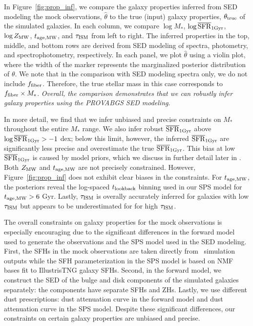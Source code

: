 In Figure~\ref{fig:prop_inf}, we compare the galaxy properties inferred from
SED modeling the mock observations, $\hat{\theta}$ to the true (input) galaxy
properties, $\theta_{\rm true}$ of the simulated galaxies.
In each column, we compare $\log M_*$, $\log \overline{\rm SFR}_{\rm 1Gyr}$, $\log Z_{\rm MW}$,
$t_{\rm age, MW}$, and $\tau_{\rm ISM}$ from left to right.  
The inferred properties in the top, middle, and bottom rows are derived from
SED modeling of spectra, photometry, and spectrophotometry, respectively.
In each panel, we plot $\hat{\theta}$ using a violin plot, where the width
of the marker represents the marginalized posterior distribution of $\theta$. 
We note that in the comparison with SED modeling spectra only, we do not
include $f_{\rm fiber}$. 
Therefore, the true stellar mass in this case corresponds to $f_{\rm fiber}
\times M_*$. 
\emph{Overall, the comparison demonstrates that we can robustly infer galaxy
properties using the {\sc PROVABGS} SED modeling}. 

In more detail, we find that we infer unbiased and precise constraints on
$M_*$ throughout the entire $M_*$ range. 
We also infer robust $\overline{\rm SFR}_{\rm 1Gyr}$ above $\log \overline{\rm SFR}_{\rm 1Gyr} > -1$ dex; below this limit,
however, the inferred $\overline{\rm SFR}_{\rm 1Gyr}$ are significantly less precise and
overestimate the true $\overline{\rm SFR}_{\rm 1Gyr}$. 
This bias at low $\overline{\rm SFR}_{\rm 1Gyr}$ is caused by model priors, which we discuss in
further detail later in . 
Both $Z_{\rm MW}$ and $t_{\rm age, MW}$ are not precisely constrained. 
However, Figure~\ref{fig:prop_inf} does not exhibit clear biases in the
constraints.
For $t_{\rm age, MW}$, the posteriors reveal the log-spaced $t_{\rm lookback}$ binning used in our
SPS model for $t_{\rm age, MW} > 6$ Gyr.
Lastly, $\tau_{\rm ISM}$ is overally accurately inferred for galaxies with low
$\tau_{\rm ISM}$ but appears to be underestimated for for high $\tau_{\rm ISM}$.

The overall constraints on galaxy properties for the mock observations is
especially encouraging due to the significant differences in the forward
model used to generate the observations and the SPS model used in the SED
modeling. 
First, the SFHs in the mock observations are taken directly from \lgal~simulation
outputs while the SFH parameterization in the SPS model is based on NMF bases fit
to IllustrisTNG galaxy SFHs.
Second, in the forward model, we construct the SED of the bulge and disk
components of the simulated galaxies separately: the components have separate
SFHs and ZHs. 
Lastly, we use different dust prescriptions: \cite{mathis1983} dust attenuation  
curve in the forward model and \cite{kriek2013} dust attenuation curve in the
SPS model. 
Despite these significant differences, our constraints on certain galaxy
properties are unbiased and precise. 

